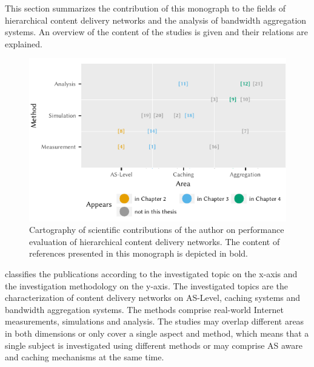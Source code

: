 This section summarizes the contribution of this monograph to the fields of hierarchical content delivery networks and the analysis of bandwidth aggregation systems.
An overview of the content of the studies is given and their relations are explained.

\begin{figure}
\centering
\includegraphics{figures/publications}
\caption{Cartography of scientific contributions of the author on performance evaluation of hierarchical content delivery networks. The content of references presented in this monograph is depicted in bold.}\label{fig:introduction:publications}
\end{figure}

 classifies the publications according to the investigated topic on the x-axis and the investigation methodology on the y-axis.
The investigated topics are the characterization of content delivery networks on AS-Level, caching systems and bandwidth aggregation systems.
The methods comprise real-world Internet measurements, simulations and analysis.
The studies may overlap different areas in both dimensions or only cover a single aspect and method, which means that a single subject is investigated using different methods or may comprise AS aware and caching mechanisms at the same time.



